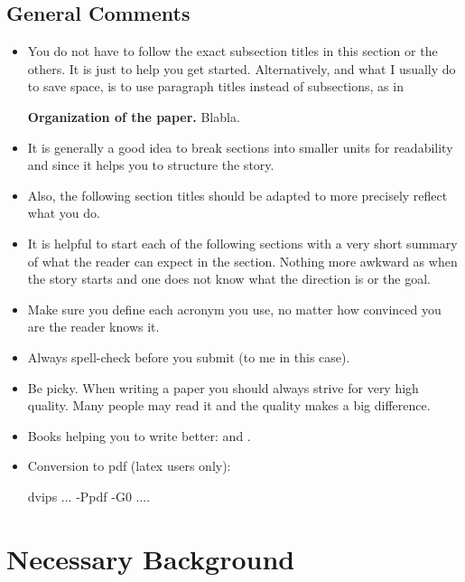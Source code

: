 \documentclass{article}
\begin{document}
\subsection{General Comments}

\begin{itemize}
\item You do not have to follow the exact subsection titles in this section
or the others. It is just to help you get started.  Alternatively, and
what I usually do to save space, is to use paragraph titles instead of
subsections, as in

{\bf Organization of the paper.} Blabla.

\item It is generally a good idea to break sections into smaller units for
readability and since it helps you to structure the story.

\item Also, the following section titles should be adapted to more precisely
reflect what you do.

\item It is helpful to start each of the following sections with a very
short summary of what the reader can expect in the section. Nothing
more awkward as when the story starts and one does not know what the
direction is or the goal.

\item Make sure you define each acronym you use, no matter how convinced you are
the reader knows it.

\item Always spell-check before you submit (to me in this case).

\item Be picky. When writing a paper you should always strive for very
high quality. Many people may read it and the quality makes a big difference.

\item Books helping you to write better: \cite{Higham:98} and \cite{Strunk:00}.

\item Conversion to pdf (latex users only): 

dvips ... -Ppdf -G0 ....
\end{itemize}


\section{Necessary Background}
\label{sec:background}
\end{document}
